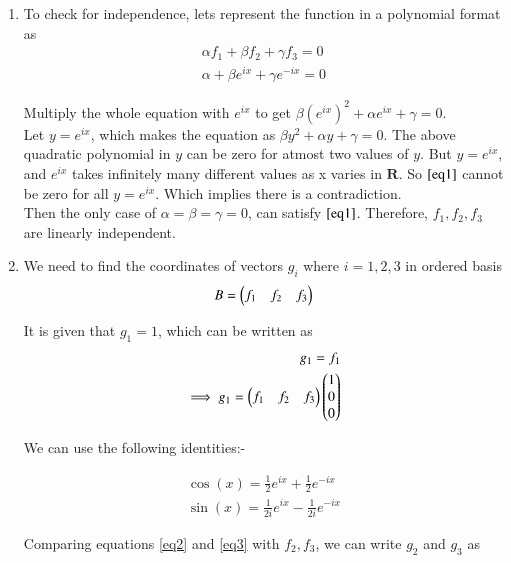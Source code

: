 \documentclass[journal,12pt,twocolumn]{IEEEtran}
\begin{document}
	\begin{enumerate}[label=(\alph*)]
		\item To check for independence, lets represent the function in a polynomial format as \\
		
		\begin{align}
			\alpha f_1 + \beta f_2 + \gamma f_3 = 0\\
			\alpha + \beta e^{ix} + \gamma e^{-ix} = 0 \label{eq1}
		\end{align}
		
		Multiply the whole equation with $e^{ix}$ to get $\beta (e^{ix})^{2} + \alpha e^{ix} + \gamma = 0$.\\ 
		
		Let $y = e^{ix}$, which makes the equation as $\beta y^{2} + \alpha y + \gamma = 0$. The above quadratic polynomial in $y$ can be zero for atmost two values of $y$. But $y = e^{ix}$, and $e^{ix}$ takes infinitely many different values as x varies in $\mathbf{R}$. So $\eqref{eq1}$ cannot be zero for all $y = e^{ix}$. Which implies there is a contradiction. \\
		
		Then the only case of $\alpha = \beta = \gamma = 0$, can satisfy $\eqref{eq1}$. Therefore, $f_1, f_2, f_3$ are linearly independent. \\
		
		\item We need to find the coordinates of vectors $g_i$ where $i = 1, 2, 3$ in ordered basis
		\begin{align}
			B = \begin{pmatrix}f_1 & f_2 & f_3\end{pmatrix} \label{eq5}
		\end{align}
		
		It is given that $g_1 = 1$, which can be written as 
		\begin{align}
			g_1 = f_1 \label{eq4}   \\ 
			\implies g_1 = \begin{pmatrix}f_1 & f_2 & f_3\end{pmatrix}\begin{pmatrix}1\\0\\0\end{pmatrix}
		\end{align}
		
		We can use the following identities:-
		
		\begin{align}
			\cos (x) = \frac{1}{2}e^{ix} + \frac{1}{2}e^{-ix} \label{eq2}\\
			\sin (x) = \frac{1}{2i}e^{ix} - \frac{1}{2i}e^{-ix} \label{eq3}
		\end{align}
		
		Comparing equations \eqref{eq2} and \eqref{eq3} with $f_2, f_3$, we can write $g_2$ and $g_3$ as 
		

\end{enumerate}
\end{document}

